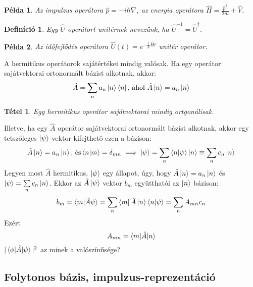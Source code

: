 \documentclass[12pt]{article}
\theoremstyle{plain}
\newtheorem*{theorem*}{Tétel}
\newtheorem*{def*}{Definíció}
\newtheorem*{pld*}{Példa}
\begin{document}
\begin{pld*}
    Az impulzus operátora $\hat p = -i\hbar \nabla$, az energia operátora $\hat H = \frac{\hat p^2}{2m} + \hat V$.
\end{pld*}

\begin{def*}
    Egy $\hat U$ operátort unitérnek nevezünk, ha $\hat U^{-1} = \hat U ^\dag$.
\end{def*}

\begin{pld*}
    Az időfejlődés operátora $\hat U(t) = e^{-\frac{i}{\hbar}\hat H t}$ unitér operátor.
\end{pld*}

A hermitikus operátorok sajátértékei mindig valósak. Ha egy operátor sajátvektorai ortonormált bázist alkotnak, akkor:
$$ \hat A = \sum\limits_{n} a_n \ket n \bra n \textrm{, ahol } \hat A \ket n = a_n \ket n $$
\begin{theorem*}
    Egy hermitikus operátor sajátvektorai mindig ortgonálisak.
\end{theorem*}
Illetve, ha egy $\hat A$ operátor sajátvektorai ortonormált bázist alkotnak, akkor egy tetszőleges $\ket \psi$ vektor
kifejthető ezen a bázison:
$$\hat A \ket n = a_n \ket n \textrm{, és} \braket{n|m} = \delta_{mn} \implies \ket\psi = \sum\limits_n \braket{n|\psi} \ket n 
\equiv  \sum\limits_n c_n \ket n$$ 
Legyen most $\hat A$ hermitikus, $\ket\psi$ egy állapot, úgy, hogy $\hat A \ket n = a_n\ket n$ és $\ket\psi = \sum\limits_n c_n \ket n$.
Ekkor az $\hat A \ket\psi$ vektor $b_m$ együtthatói az $\ket n$ bázison:
$$b_m = \braket{m|\hat A \psi} = \sum\limits_n \bra{m} \hat A \ket n \braket{n|\psi} = \sum\limits_n A_{mn}c_n$$
Ezért $$A_{mn} = \braket{ m |\hat A | n }$$
$|\braket{ \phi | \hat A | \psi}|^2$ az minek a valószínűsége?

\subsection{Folytonos bázis, impulzus-reprezentáció}
\end{document}
